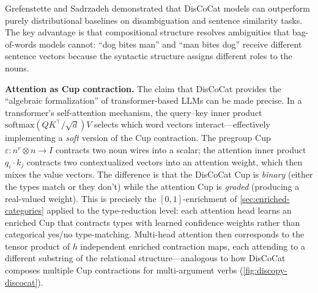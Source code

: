 \documentclass[
]{article}
\begin{document}
Grefenstette and Sadrzadeh \citeyearpar{grefenstette2015concrete}
demonstrated that DisCoCat models can outperform purely distributional
baselines on disambiguation and sentence similarity tasks. The key
advantage is that compositional structure resolves ambiguities that
bag-of-words models cannot: ``dog bites man'' and ``man bites dog''
receive different sentence vectors because the syntactic structure
assigns different roles to the nouns.

\textbf{Attention as Cup contraction.} The claim that DisCoCat provides
the ``algebraic formalization'' of transformer-based LLMs can be made
precise. In a transformer's self-attention mechanism, the query--key
inner product \(\mathrm{softmax}(QK^\top / \sqrt{d})V\) selects which
word vectors interact---effectively implementing a \emph{soft} version
of the Cup contraction. The pregroup Cup
\(\varepsilon: n^r \otimes n \to I\) contracts two noun wires into a
scalar; the attention inner product \(q_i \cdot k_j\) contracts two
contextualized vectors into an attention weight, which then mixes the
value vectors. The difference is that the DisCoCat Cup is \emph{binary}
(either the types match or they don't) while the attention Cup is
\emph{graded} (producing a real-valued weight). This is precisely the
\([0,1]\)-enrichment of \autoref{sec:enriched-categories} applied to the
type-reduction level: each attention head learns an enriched Cup that
contracts types with learned confidence weights rather than categorical
yes/no type-matching. Multi-head attention then corresponds to the
tensor product of \(h\) independent enriched contraction maps, each
attending to a different substring of the relational
structure---analogous to how DisCoCat composes multiple Cup contractions
for multi-argument verbs (\autoref{fig:discopy-discocat}).
\end{document}
